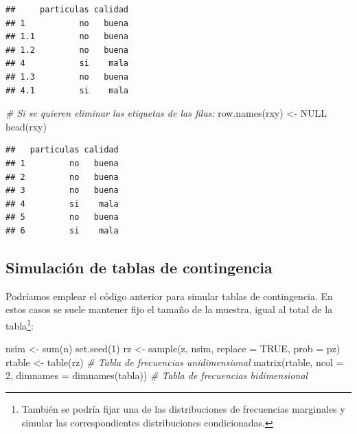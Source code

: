 \documentclass[
]{book}
\newenvironment{Shaded}{\begin{snugshade}}{\end{snugshade}}
\newcommand{\AttributeTok}[1]{\textcolor[rgb]{0.77,0.63,0.00}{#1}}
\newcommand{\CommentTok}[1]{\textcolor[rgb]{0.56,0.35,0.01}{\textit{#1}}}
\newcommand{\ConstantTok}[1]{\textcolor[rgb]{0.00,0.00,0.00}{#1}}
\newcommand{\DecValTok}[1]{\textcolor[rgb]{0.00,0.00,0.81}{#1}}
\newcommand{\FunctionTok}[1]{\textcolor[rgb]{0.00,0.00,0.00}{#1}}
\newcommand{\NormalTok}[1]{#1}
\newcommand{\OtherTok}[1]{\textcolor[rgb]{0.56,0.35,0.01}{#1}}
\theoremstyle{break}
\theoremstyle{nonumberplain}
\begin{document}
\begin{verbatim}
##     particulas calidad
## 1           no   buena
## 1.1         no   buena
## 1.2         no   buena
## 4           si    mala
## 1.3         no   buena
## 4.1         si    mala
\end{verbatim}

\begin{Shaded}
\begin{Highlighting}[]
\CommentTok{\# Si se quieren eliminar las etiquetas de las filas:}
\FunctionTok{row.names}\NormalTok{(rxy) }\OtherTok{\textless{}{-}} \ConstantTok{NULL}
\FunctionTok{head}\NormalTok{(rxy)}
\end{Highlighting}
\end{Shaded}

\begin{verbatim}
##   particulas calidad
## 1         no   buena
## 2         no   buena
## 3         no   buena
## 4         si    mala
## 5         no   buena
## 6         si    mala
\end{verbatim}

\hypertarget{simconting}{%
\subsection{Simulación de tablas de contingencia}\label{simconting}}

Podríamos emplear el código anterior para simular tablas de contingencia.
En estos casos se suele mantener fijo el tamaño de la muestra, igual al total de la tabla\footnote{También se podría fijar una de las distribuciones de frecuencias marginales y simular las correspondientes distribuciones condicionadas.}:

\begin{Shaded}
\begin{Highlighting}[]
\NormalTok{nsim }\OtherTok{\textless{}{-}} \FunctionTok{sum}\NormalTok{(n)}
\FunctionTok{set.seed}\NormalTok{(}\DecValTok{1}\NormalTok{)}
\NormalTok{rz }\OtherTok{\textless{}{-}} \FunctionTok{sample}\NormalTok{(z, nsim, }\AttributeTok{replace =} \ConstantTok{TRUE}\NormalTok{, }\AttributeTok{prob =}\NormalTok{ pz)}
\NormalTok{rtable }\OtherTok{\textless{}{-}} \FunctionTok{table}\NormalTok{(rz) }\CommentTok{\# Tabla de frecuencias unidimensional}
\FunctionTok{matrix}\NormalTok{(rtable, }\AttributeTok{ncol =} \DecValTok{2}\NormalTok{, }\AttributeTok{dimnames =} \FunctionTok{dimnames}\NormalTok{(tabla)) }\CommentTok{\# Tabla de frecuencias bidimensional}
\end{Highlighting}
\end{Shaded}
\end{document}
